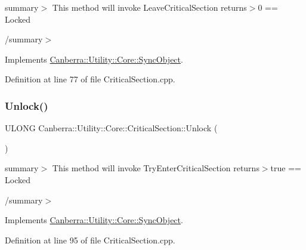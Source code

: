 summary$>$ This method will invoke Leave\+Critical\+Section returns$>$0 == Locked

/summary$>$ 

Implements \hyperlink{class_canberra_1_1_utility_1_1_core_1_1_sync_object}{Canberra\+::\+Utility\+::\+Core\+::\+Sync\+Object}.



Definition at line 77 of file Critical\+Section.\+cpp.

\mbox{\label{class_canberra_1_1_utility_1_1_core_1_1_critical_section_a78d9486915ae3ed0687fd404af8bb078_a78d9486915ae3ed0687fd404af8bb078}} 
\subsubsection{\texorpdfstring{Unlock()}{Unlock()}}
{\footnotesize\ttfamily U\+L\+O\+NG Canberra\+::\+Utility\+::\+Core\+::\+Critical\+Section\+::\+Unlock (\begin{DoxyParamCaption}{ }\end{DoxyParamCaption})\hspace{0.3cm}{\ttfamily [virtual]}}

summary$>$ This method will invoke Try\+Enter\+Critical\+Section returns$>$true == Locked

/summary$>$ 

Implements \hyperlink{class_canberra_1_1_utility_1_1_core_1_1_sync_object}{Canberra\+::\+Utility\+::\+Core\+::\+Sync\+Object}.



Definition at line 95 of file Critical\+Section.\+cpp.

\mbox{\label{class_canberra_1_1_utility_1_1_core_1_1_critical_section_a1f6ce2fecd7176f7580c091437920c96_a1f6ce2fecd7176f7580c091437920c96}} 
